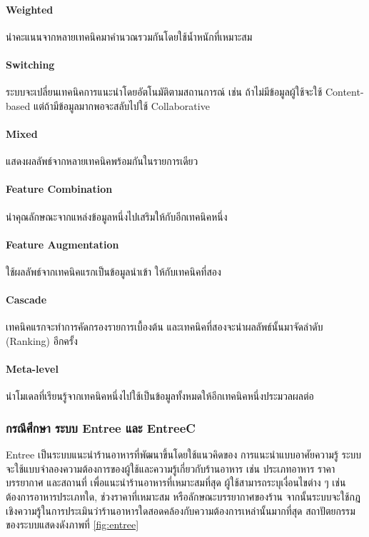 \paragraph{Weighted}
นำคะแนนจากหลายเทคนิคมาคำนวณรวมกันโดยใช้น้ำหนักที่เหมาะสม

\paragraph{Switching}
ระบบจะเปลี่ยนเทคนิคการแนะนำโดยอัตโนมัติตามสถานการณ์ เช่น ถ้าไม่มีข้อมูลผู้ใช้จะใช้ Content-based แต่ถ้ามีข้อมูลมากพอจะสลับไปใช้ Collaborative

\paragraph{Mixed}
แสดงผลลัพธ์จากหลายเทคนิคพร้อมกันในรายการเดียว

\paragraph{Feature Combination}
นำคุณลักษณะจากแหล่งข้อมูลหนึ่งไปเสริมให้กับอีกเทคนิคหนึ่ง

\paragraph{Feature Augmentation}
ใช้ผลลัพธ์จากเทคนิคแรกเป็นข้อมูลนำเข้า ให้กับเทคนิคที่สอง

\paragraph{Cascade}
เทคนิคแรกจะทำการคัดกรองรายการเบื้องต้น และเทคนิคที่สองจะนำผลลัพธ์นั้นมาจัดลำดับ (Ranking) อีกครั้ง 

\paragraph{Meta-level}
นำโมเดลที่เรียนรู้จากเทคนิคหนึ่งไปใช้เป็นข้อมูลทั้งหมดให้อีกเทคนิคหนึ่งประมวลผลต่อ 


\subsubsection{กรณีศึกษา ระบบ Entree และ EntreeC}

Entree เป็นระบบแนะนำร้านอาหารที่พัฒนาขึ้นโดยใช้แนวคิดของ การแนะนำแบบอาศัยความรู้ ระบบจะใช้แบบจำลองความต้องการของผู้ใช้และความรู้เกี่ยวกับร้านอาหาร เช่น ประเภทอาหาร ราคา บรรยากาศ และสถานที่ เพื่อแนะนำร้านอาหารที่เหมาะสมที่สุด ผู้ใช้สามารถระบุเงื่อนไขต่าง ๆ เช่น ต้องการอาหารประเภทใด, ช่วงราคาที่เหมาะสม หรือลักษณะบรรยากาศของร้าน จากนั้นระบบจะใช้กฎเชิงความรู้ในการประเมินว่าร้านอาหารใดสอดคล้องกับความต้องการเหล่านั้นมากที่สุด สถาปัตยกรรมของระบบแสดงดังภาพที่ \ref{fig:entree} \cite{hybrid_nd} 

